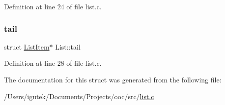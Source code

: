 Definition at line 24 of file list.\+c.

\mbox{\label{structList_a6d4b5761bf36f1d143057557e034eb0b}} 
\subsubsection{\texorpdfstring{tail}{tail}}
{\footnotesize\ttfamily struct \mbox{\hyperlink{structListItem}{List\+Item}}$\ast$ List\+::tail}



Definition at line 28 of file list.\+c.



The documentation for this struct was generated from the following file\+:\begin{DoxyCompactItemize}
\item 
/\+Users/igutek/\+Documents/\+Projects/ooc/src/\mbox{\hyperlink{list_8c}{list.\+c}}\end{DoxyCompactItemize}
